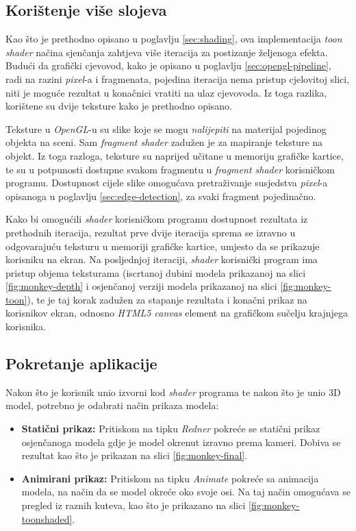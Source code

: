 \subsection{Korištenje više slojeva}
\label{sec:multipass-rendering}

Kao što je prethodno opisano u poglavlju \ref{sec:shading}, ova implementacija \emph{toon shader} načina sjenčanja zahtjeva više iteracija za postizanje željenoga efekta. Budući da grafički cjevovod, kako je opisano u poglavlju \ref{sec:opengl-pipeline}, radi na razini \emph{pixel}-a i fragmenata, pojedina iteracija nema pristup cjelovitoj slici, niti je moguće rezultat u konačnici vratiti na ulaz cjevovoda. Iz toga razlika, korištene su dvije teksture kako je prethodno opisano.

Teksture u \emph{OpenGL}-u su slike koje se mogu \emph{nalijepiti} na materijal pojedinog objekta na sceni. Sam \emph{fragment shader} zadužen je za mapiranje teksture na objekt. Iz toga razloga, teksture su naprijed učitane u memoriju grafičke kartice, te su u potpunosti dostupne svakom fragmentu u \emph{fragment shader} korisničkom programu. Dostupnost cijele slike omogućava pretraživanje susjedstva \emph{pixel}-a opisanoga u poglavlju \ref{sec:edge-detection}, za svaki fragment pojedinačno.

Kako bi omogućili \emph{shader} korisničkom programu dostupnost rezultata iz prethodnih iteracija, rezultat prve dvije iteracija sprema se izravno u odgovarajuću teksturu u memoriji grafičke kartice, umjesto da se prikazuje korisniku na ekran. Na posljednjoj iteraciji, \emph{shader} korisnički program ima pristup objema teksturama (iscrtanoj dubini modela prikazanoj na slici \ref{fig:monkey-depth} i osjenčanoj verziji modela prikazanoj na slici \ref{fig:monkey-toon}), te je taj korak zadužen za stapanje rezultata i konačni prikaz na korisnikov ekran, odnosno \emph{HTML5 canvas} element na grafičkom sučelju krajnjega korisnika.

\subsection{Pokretanje aplikacije}

Nakon što je korisnik unio izvorni kod \emph{shader} programa te nakon što je unio 3D model, potrebno je odabrati način prikaza modela:

\begin{itemize}
\item \textbf{Statični prikaz:} Pritiskom na tipku \emph{Redner} pokreće se statični prikaz osjenčanoga modela gdje je model okrenut izravno prema kameri. Dobiva se rezultat kao što je prikazan na slici \ref{fig:monkey-final}.

\item \textbf{Animirani prikaz:} Pritiskom na tipku \emph{Animate} pokreće sa animacija modela, na način da se model okreće oko svoje osi. Na taj način omogućava se pregled iz raznih kuteva, kao što je prikazano na slici \ref{fig:monkey-toonshaded}.
\end{itemize}

